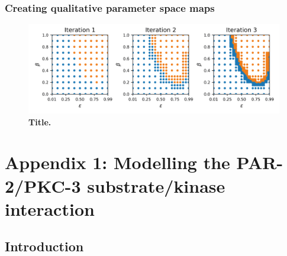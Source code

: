 \documentclass[12pt]{"report"}
\newcommand{\mycaption}[2]{\caption[#1]{\textbf{#1.} #2}}
\begin{document}


\subsection{Creating qualitative parameter space maps}

\begin{figure}
\includegraphics[scale=1]{paramspace_method}
\centering
\mycaption{Title}{}
\label{fig:paramspace_method}
\end{figure}


\clearpage
\chapter*{Appendix 1: Modelling the PAR-2/PKC-3 substrate/kinase interaction}

\clearpage
\section*{Introduction}
\end{document}
